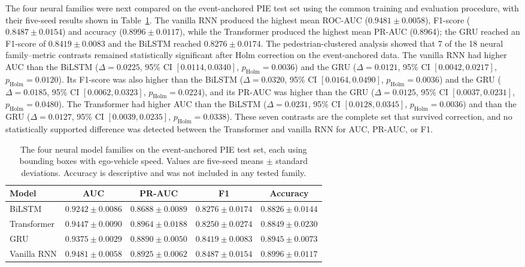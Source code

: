 \documentclass[mti,article,submit,moreauthors]{Definitions/mdpi}
\begin{document}
The four neural families were next compared on the event-anchored PIE test set using the common training and evaluation procedure, with their five-seed results shown in Table~\ref{tab:model-results}. The vanilla RNN produced the highest mean ROC-AUC ($0.9481\pm0.0058$), F1-score ($0.8487\pm0.0154$) and accuracy ($0.8996\pm0.0117$), while the Transformer produced the highest mean PR-AUC (0.8964); the GRU reached an F1-score of $0.8419\pm0.0083$ and the BiLSTM reached $0.8276\pm0.0174$. The pedestrian-clustered analysis showed that 7 of the 18 neural family--metric contrasts remained statistically significant after Holm correction on the event-anchored data. The vanilla RNN had higher AUC than the BiLSTM ($\Delta=0.0225$, 95\% CI $[0.0114,0.0340]$, $p_{\mathrm{Holm}}=0.0036$) and the GRU ($\Delta=0.0121$, 95\% CI $[0.0042,0.0217]$, $p_{\mathrm{Holm}}=0.0120$). Its F1-score was also higher than the BiLSTM ($\Delta=0.0320$, 95\% CI $[0.0164,0.0490]$, $p_{\mathrm{Holm}}=0.0036$) and the GRU ($\Delta=0.0185$, 95\% CI $[0.0062,0.0323]$, $p_{\mathrm{Holm}}=0.0224$), and its PR-AUC was higher than the GRU ($\Delta=0.0125$, 95\% CI $[0.0037,0.0231]$, $p_{\mathrm{Holm}}=0.0480$). The Transformer had higher AUC than the BiLSTM ($\Delta=0.0231$, 95\% CI $[0.0128,0.0345]$, $p_{\mathrm{Holm}}=0.0036$) and than the GRU ($\Delta=0.0127$, 95\% CI $[0.0039,0.0235]$, $p_{\mathrm{Holm}}=0.0338$). These seven contrasts are the complete set that survived correction, and no statistically supported difference was detected between the Transformer and vanilla RNN for AUC, PR-AUC, or F1.

\begin{table}[htbp]
\centering
\caption{The four neural model families on the event-anchored PIE test set, each using
bounding boxes with ego-vehicle speed. Values are five-seed means $\pm$ standard deviations.
Accuracy is descriptive and was not included in any tested family.}
\label{tab:model-results}
\setlength{\tabcolsep}{5pt}
\begin{tabular}{lcccc}
\toprule
\textbf{Model} & \textbf{AUC} & \textbf{PR-AUC} & \textbf{F1} & \textbf{Accuracy} \\
\midrule
BiLSTM &
$0.9242\pm0.0086$ & $0.8688\pm0.0089$ & $0.8276\pm0.0174$ & $0.8826\pm0.0144$ \\
Transformer &
$0.9447\pm0.0090$ & $\mathbf{0.8964\pm0.0188}$ & $0.8250\pm0.0274$ & $0.8849\pm0.0230$ \\
GRU &
$0.9375\pm0.0029$ & $0.8890\pm0.0050$ & $0.8419\pm0.0083$ & $0.8945\pm0.0073$ \\
Vanilla RNN &
$\mathbf{0.9481\pm0.0058}$ & $0.8925\pm0.0062$ & $\mathbf{0.8487\pm0.0154}$ &
$\mathbf{0.8996\pm0.0117}$ \\
\bottomrule
\end{tabular}
\end{table}
\end{document}
